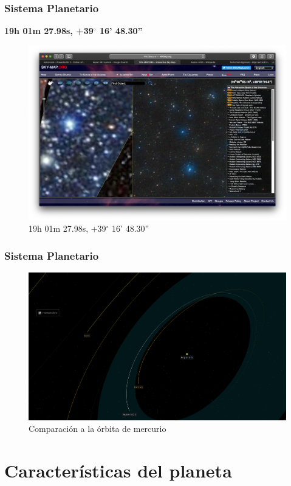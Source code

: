 \documentclass[UKenglish]{beamer}
\begin{document}
\begin{frame}
\frametitle{Sistema Planetario}{\textbf{19h 01m 27.98s, +39$^{\circ}$ 16' 48.30''}}
\begin{figure}[h!]
    \centering
    \includegraphics[scale=0.2]{Imagenes/3}
    \caption{19h 01m 27.98s, +39$^{\circ}$ 16' 48.30''}
    \label{fig:pun2tos6}
    \end{figure}
\end{frame}

\begin{frame}
\frametitle{Sistema Planetario}
\begin{figure}[h!]
    \centering
    \includegraphics[scale=0.2]{Imagenes/6}
    \caption{Comparación a la órbita de mercurio}
    \label{fig:pun2tos}
    \end{figure}
\end{frame}


\section{Características del planeta}
\end{document}
